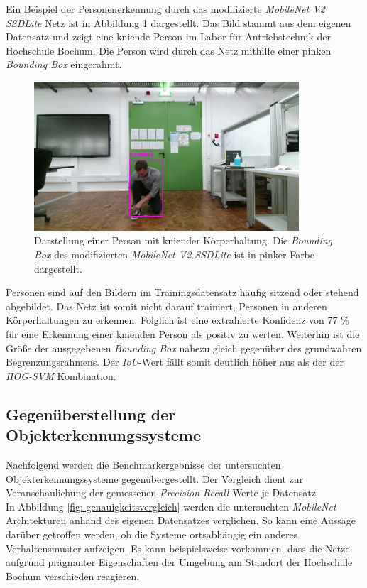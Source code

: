 Ein Beispiel der Personenerkennung durch das modifizierte \textit{MobileNet V2 SSDLite} Netz ist in Abbildung \ref{fig: ownnetiou} dargestellt. Das Bild stammt aus dem eigenen Datensatz und zeigt eine kniende Person im Labor für Antriebstechnik der Hochschule Bochum. Die Person wird durch das Netz mithilfe einer pinken \textit{Bounding Box} eingerahmt.\\
	\begin{figure}[H]
	\centering
	\includegraphics[width=0.88\textwidth]{Bilder/12.jpg}
	\caption{Darstellung einer Person mit kniender Körperhaltung. Die \textit{Bounding Box} des modifizierten \textit{MobileNet V2 SSDLite} ist in pinker Farbe dargestellt.}
	\label{fig: ownnetiou}
\end{figure}
Personen sind auf den Bildern im Trainingsdatensatz häufig sitzend oder stehend abgebildet. Das Netz ist somit nicht darauf trainiert, Personen in anderen Körperhaltungen zu erkennen. Folglich ist eine extrahierte Konfidenz von 77 \% für eine Erkennung einer knienden Person als positiv zu werten. Weiterhin ist die Größe der ausgegebenen \textit{Bounding Box} nahezu gleich gegenüber des grundwahren Begrenzungsrahmens. Der \textit{IoU}-Wert fällt somit deutlich höher aus als der der \textit{HOG-SVM} Kombination.



\subsection{Gegenüberstellung der Objekterkennungssysteme}

Nachfolgend werden die Benchmarkergebnisse der untersuchten Objekterkennungssysteme gegenübergestellt. Der Vergleich dient zur Veranschaulichung der gemessenen \textit{Precision-Recall} Werte je Datensatz.\\

In Abbildung \ref{fig: genauigkeitsvergleich} werden die untersuchten \textit{MobileNet} Architekturen anhand des eigenen Datensatzes verglichen. So kann eine Aussage darüber getroffen werden, ob die Systeme ortsabhängig ein anderes Verhaltensmuster aufzeigen. Es kann beispielsweise vorkommen, dass die Netze aufgrund prägnanter Eigenschaften der Umgebung am Standort der Hochschule Bochum verschieden reagieren.\\

